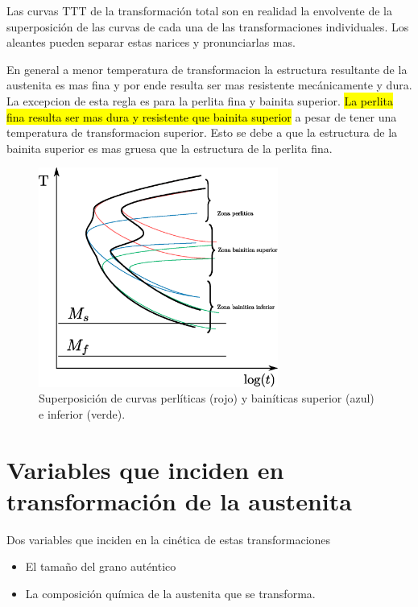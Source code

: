\documentclass{article}
\begin{document}
Las curvas TTT de la transformación total son en realidad la envolvente de la superposición de las curvas de cada una de las transformaciones individuales. Los aleantes pueden separar estas narices y pronunciarlas mas.

En general a menor temperatura de transformacion la estructura resultante de la austenita es mas fina y por ende resulta ser mas resistente mecánicamente y dura. La excepcion de esta regla es para la perlita fina y bainita superior. \hl{La perlita fina resulta ser mas dura y resistente que bainita superior} a pesar de tener una temperatura de transformacion superior. Esto se debe a que la estructura de la bainita superior es mas gruesa que la estructura de la perlita fina.

\begin{figure}[htb!]
    \centering
    \includegraphics[width=0.7\textwidth]{fig/TTTsuperpuesta.eps}
    \caption{Superposición de curvas perlíticas (rojo) y bainíticas superior (azul) e inferior (verde).}
    \label{fig:TTTsuperpuestas}
\end{figure}

\section[Transformación de la austenita]{Variables que inciden en transformación de la austenita}
Dos variables que inciden en la cinética de estas transformaciones
\begin{itemize}
    \item El tamaño del grano auténtico
    \item La composición química de la austenita que se transforma.
\end{itemize}
\end{document}
